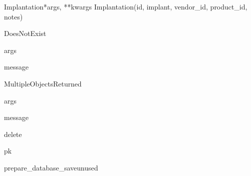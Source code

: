 \documentclass[letterpaper,10pt,english]{sphinxmanual}
\begin{document}
\hypertarget{data.models.Implantation}{}\begin{classdesc}{Implantation}{*args, **kwargs}
Implantation(id, implant, vendor\_id, product\_id, notes)

\hypertarget{data.models.Implantation.DoesNotExist}{}\begin{excdesc}{DoesNotExist}~

\hypertarget{data.models.Implantation.DoesNotExist.args}{}\begin{memberdesc}{args}\end{memberdesc}

\hypertarget{data.models.Implantation.DoesNotExist.message}{}\begin{memberdesc}{message}\end{memberdesc}
\end{excdesc}

\hypertarget{data.models.Implantation.MultipleObjectsReturned}{}\begin{excdesc}{MultipleObjectsReturned}~

\hypertarget{data.models.Implantation.MultipleObjectsReturned.args}{}\begin{memberdesc}{args}\end{memberdesc}

\hypertarget{data.models.Implantation.MultipleObjectsReturned.message}{}\begin{memberdesc}{message}\end{memberdesc}
\end{excdesc}

\hypertarget{data.models.Implantation.delete}{}\begin{methoddesc}[Implantation]{delete}{}\end{methoddesc}

\hypertarget{data.models.Implantation.pk}{}\begin{memberdesc}[Implantation]{pk}\end{memberdesc}

\hypertarget{data.models.Implantation.prepare_database_save}{}\begin{methoddesc}[Implantation]{prepare\_database\_save}{unused}\end{methoddesc}


\end{classdesc}
\end{document}
